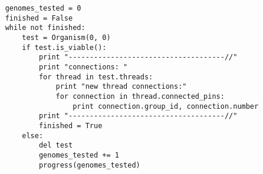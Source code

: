 \documentclass[a4paper]{article}
\begin{document}
\begin{enumerate}
\begin{verbatim}
    genomes_tested = 0
    finished = False
    while not finished:
        test = Organism(0, 0)
        if test.is_viable():
            print "-------------------------------------//"
            print "connections: "
            for thread in test.threads:
                print "new thread connections:"
                for connection in thread.connected_pins:
                    print connection.group_id, connection.number
            print "-------------------------------------//"
            finished = True
        else:
            del test
            genomes_tested += 1
            progress(genomes_tested)
\end{verbatim}
\end{enumerate}
\end{document}
